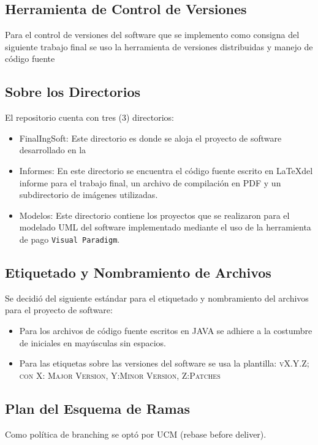 \documentclass[10pt]{article} %
\newcommand{\comillas}[1]{``#1''}
\begin{document}
\subsection{Herramienta de Control de Versiones}
Para el control de versiones del software que se implemento como consigna del siguiente trabajo final se uso la herramienta de versiones distribuidas y manejo de código fuente %

\subsection{Sobre los Directorios}
El repositorio cuenta con tres (3) directorios:
\begin{itemize}
\item FinalIngSoft: Este directorio es donde se aloja el proyecto de software desarrollado en la %
\item Informes: En este directorio se encuentra el código fuente escrito en \LaTeX del informe para el trabajo final, un archivo de compilación en PDF y un subdirectorio de imágenes utilizadas.
\item Modelos: Este directorio contiene los proyectos que se realizaron para el modelado UML del software implementado mediante el uso de la herramienta de pago \verb+Visual Paradigm+\circledR.
\end{itemize}

\subsection{Etiquetado y Nombramiento de Archivos}
Se decidió del siguiente estándar para el etiquetado y nombramiento del archivos para el proyecto de software:
\begin{itemize}
\item Para los archivos de código fuente escritos en JAVA se adhiere a la costumbre de iniciales en mayúsculas sin espacios.
\item Para las etiquetas sobre las versiones del software se usa la plantilla: \textsc{vX.Y.Z; con X: Major Version, Y:Minor Version, Z:Patches}
\end{itemize}

\subsection{Plan del Esquema de Ramas}
Como política de branching se optó por UCM (rebase before deliver).
\end{document}
